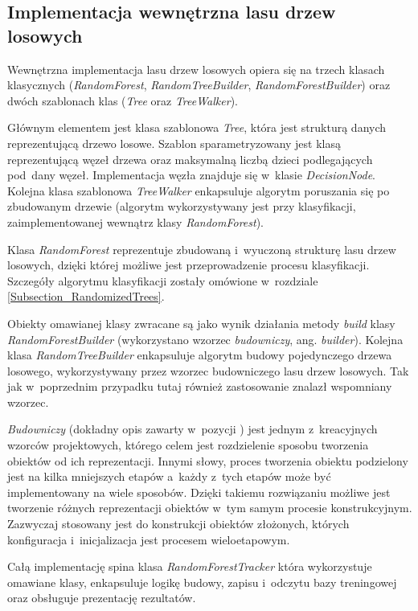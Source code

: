   \subsection{Implementacja wewnętrzna lasu drzew losowych}
  Wewnętrzna implementacja lasu drzew losowych opiera się na trzech klasach klasycznych (\textit{RandomForest}, \textit{RandomTreeBuilder}, \textit{RandomForestBuilder}) oraz dwóch szablonach klas (\textit{Tree} oraz \textit{TreeWalker}).

  Głównym elementem jest klasa szablonowa \textit{Tree}, która jest strukturą danych reprezentującą drzewo losowe. Szablon sparametryzowany jest klasą reprezentującą węzeł drzewa oraz maksymalną liczbą dzieci podlegających pod~dany węzeł. Implementacja węzła znajduje się w~klasie \textit{DecisionNode}. Kolejna klasa szablonowa \textit{TreeWalker} enkapsuluje algorytm poruszania się po zbudowanym drzewie (algorytm wykorzystywany jest przy klasyfikacji, zaimplementowanej wewnątrz klasy \textit{RandomForest}).

  Klasa \textit{RandomForest} reprezentuje zbudowaną i~wyuczoną strukturę lasu drzew losowych, dzięki której możliwe jest przeprowadzenie procesu klasyfikacji. Szczegóły algorytmu klasyfikacji zostały omówione w~rozdziale \ref{Subsection_RandomizedTrees}.

  Obiekty omawianej klasy zwracane są jako wynik działania metody \textit{build} klasy \textit{RandomForestBuilder} (wykorzystano wzorzec \textit{budowniczy}, ang. \textit{builder}). Kolejna klasa \textit{RandomTreeBuilder} enkapsuluje algorytm budowy pojedynczego drzewa losowego, wykorzystywany przez wzorzec budowniczego lasu drzew losowych. Tak jak w~poprzednim przypadku tutaj również zastosowanie znalazł wspomniany wzorzec.

  \textit{Budowniczy} (dokładny opis zawarty w~pozycji \cite{PatternsGoF}) jest jednym z~kreacyjnych wzorców projektowych, którego celem jest rozdzielenie sposobu tworzenia obiektów od ich reprezentacji. Innymi słowy, proces tworzenia obiektu podzielony jest na kilka mniejszych etapów a~każdy z~tych etapów może być implementowany na wiele sposobów. Dzięki takiemu rozwiązaniu możliwe jest tworzenie różnych reprezentacji obiektów w~tym samym procesie konstrukcyjnym. Zazwyczaj stosowany jest do konstrukcji obiektów złożonych, których konfiguracja i~inicjalizacja jest procesem wieloetapowym.

  Całą implementację spina klasa \textit{RandomForestTracker} która wykorzystuje omawiane klasy, enkapsuluje logikę budowy, zapisu i~odczytu bazy treningowej oraz obsługuje prezentację rezultatów.

